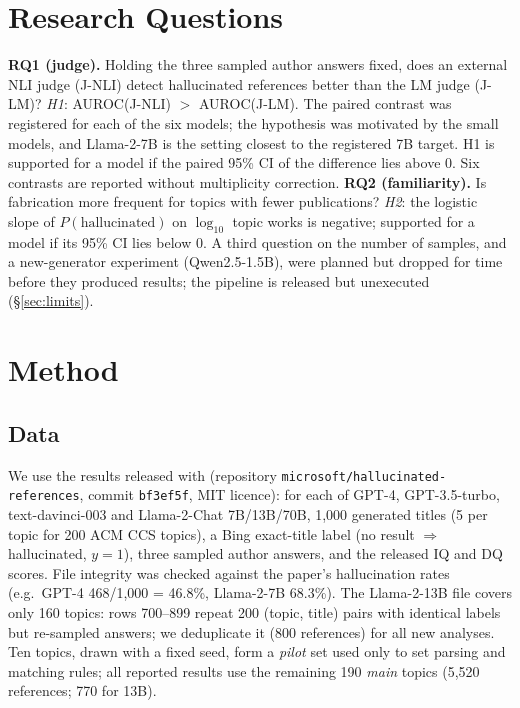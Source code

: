 \documentclass[acmsmall,screen]{acmart}
\begin{document}
\section{Research Questions}\label{sec:rq}
\textbf{RQ1 (judge).} Holding the three sampled author answers fixed, does an external NLI judge (J-NLI) detect hallucinated references better than the LM judge (J-LM)? \emph{H1}: AUROC(J-NLI) $>$ AUROC(J-LM). The paired contrast was registered for each of the six models; the hypothesis was motivated by the small models, and Llama-2-7B is the setting closest to the registered 7B target. H1 is supported for a model if the paired 95\% CI of the difference lies above 0. Six contrasts are reported without multiplicity correction.
\textbf{RQ2 (familiarity).} Is fabrication more frequent for topics with fewer publications? \emph{H2}: the logistic slope of $P(\text{hallucinated})$ on $\log_{10}$ topic works is negative; supported for a model if its 95\% CI lies below 0.
A third question on the number of samples, and a new-generator experiment (Qwen2.5-1.5B), were planned but dropped for time before they produced results; the pipeline is released but unexecuted (\S\ref{sec:limits}).

\section{Method}\label{sec:method}
\subsection{Data}
We use the results released with \cite{agrawal2023hallucinating} (repository \texttt{microsoft/hallucinated-references}, commit \texttt{bf3ef5f}, MIT licence): for each of GPT-4, GPT-3.5-turbo, text-davinci-003 and Llama-2-Chat 7B/13B/70B, 1{,}000 generated titles (5 per topic for 200 ACM CCS topics), a Bing exact-title label (no result $\Rightarrow$ hallucinated, $y=1$), three sampled author answers, and the released IQ and DQ scores. File integrity was checked against the paper's hallucination rates (e.g.\ GPT-4 468/1{,}000 = 46.8\%, Llama-2-7B 68.3\%). The Llama-2-13B file covers only 160 topics: rows 700--899 repeat 200 (topic, title) pairs with identical labels but re-sampled answers; we deduplicate it (800 references) for all new analyses. Ten topics, drawn with a fixed seed, form a \emph{pilot} set used only to set parsing and matching rules; all reported results use the remaining 190 \emph{main} topics (5{,}520 references; 770 for 13B).
\end{document}
